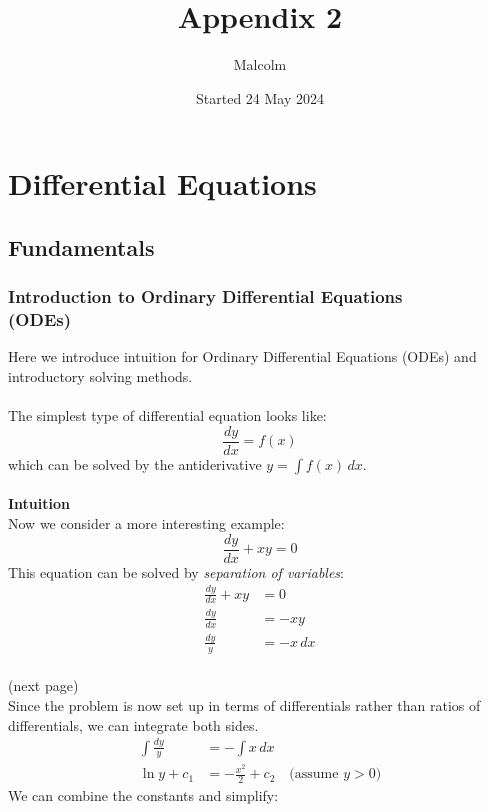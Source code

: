 \documentclass{report}
\title{Appendix 2}
\date{Started 24 May 2024}
\author{Malcolm}
\begin{document}
\maketitle

\tableofcontents

\appendix
\chapter{Differential Equations}
\section{Fundamentals}
\subsection{Introduction to Ordinary Differential Equations\\(ODEs)} %
Here we introduce intuition for  Ordinary Differential Equations (ODEs) and introductory solving methods.\\
\vspace{1mm}\\
The simplest type of differential equation looks like:
\begin{equation*}
\frac{dy}{dx}=f(x)
\end{equation*}
which can be solved by the antiderivative $y=\int f(x)\,dx$. \\
\vspace{1mm}\\
\textbf{Intuition}\\
Now we consider a more interesting example: 
\begin{equation*}
\frac{dy}{dx}+xy=0
\end{equation*}
This equation can be solved by \textit{separation of variables}:
\begin{align*}
\frac{dy}{dx}+xy&=0\\
\frac{dy}{dx}&=-xy\\
\frac{dy}{y}&=-x\,dx
\end{align*}\\
(next page)\\
Since the problem is now set up in terms of differentials rather than ratios of differentials,
we can integrate both sides.
\begin{align*}
\int\frac{dy}{y}&=-\int x\,dx\\
\ln y+c_1&=-\frac{x^2}{2}+c_2\quad\text{(assume $y>0$)}
\end{align*}
We can combine the constants and simplify:
\end{document}

